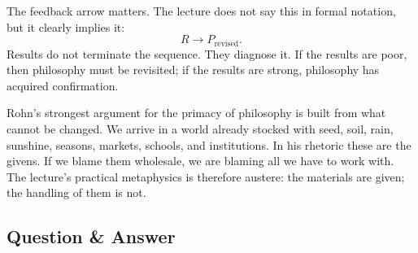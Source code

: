 \begin{figure}
\begin{center}
\end{center}
\end{figure}

The feedback arrow matters. The lecture does not say this in formal notation, but it clearly implies it:
\begin{equation}
R \to P_{\text{revised}}.
\end{equation}
Results do not terminate the sequence. They diagnose it. If the results are poor, then philosophy must be revisited; if the results are strong, philosophy has acquired confirmation.

Rohn's strongest argument for the primacy of philosophy is built from what cannot be changed. We arrive in a world already stocked with seed, soil, rain, sunshine, seasons, markets, schools, and institutions. In his rhetoric these are the givens. If we blame them wholesale, we are blaming all we have to work with. The lecture's practical metaphysics is therefore austere: the materials are given; the handling of them is not.

\subsection{Question \& Answer}

